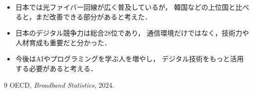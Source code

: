 \documentclass[a4paper,11pt,dvipdfmx]{ujarticle}
\begin{document}
\begin{itemize}
    \item 日本では光ファイバー回線が広く普及しているが，
    韓国などの上位国と比べると，まだ改善できる部分があると考えた．

    \item 日本のデジタル競争力は総合28位であり，
    通信環境だけではなく，技術力や人材育成も重要だと分かった．

    \item 今後はAIやプログラミングを学ぶ人を増やし，
    デジタル技術をもっと活用する必要があると考える．
\end{itemize}
\begin{thebibliography}{9}
OECD, \textit{Broadband Statistics}, 2024.
\end{thebibliography}
\end{document}
